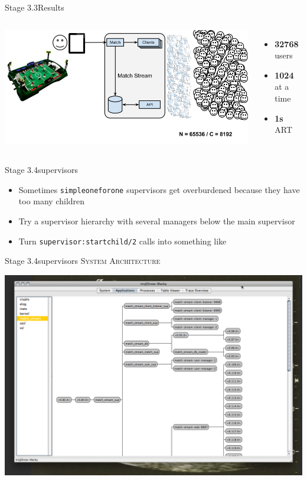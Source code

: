 \documentclass[utf8]{beamer}
\begin{document}
\begin{frame}{Stage 3.3}{Results}
	\begin{columns}
			\includegraphics[top=-1,width=\textwidth]{img/MatchStream-3.png}
			\begin{itemize}
				\item \textbf{\Large 32768} users
				\item \textbf{\Large 1024} at a time
				\item \textbf{\Large 1s} ART
			\end{itemize}
	\end{columns}
\end{frame}
\begin{frame}{Stage 3.4}{supervisors}
	\begin{itemize}
		\item Sometimes \texttt{simple\textunderscore one\textunderscore for\textunderscore one} supervisors get \alert{overburdened} because they have too many children
		\item Try a supervisor hierarchy with several managers below the main supervisor
		\item Turn \texttt{supervisor:start\textunderscore child/2} calls into something like
		\startchild
	\end{itemize}
\end{frame}
\begin{frame}{Stage 3.4}{supervisors}
	\textsc{System Architecture}
	\begin{center}
		\includegraphics[height=.75\textheight]{img/running-late.png}
	\end{center}
\end{frame}
\end{document}

